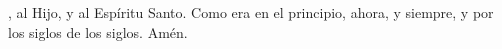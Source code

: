 , al Hijo, y al Espíritu Santo. Como era en el principio, ahora, y siempre, y por los siglos de los siglos. Amén.